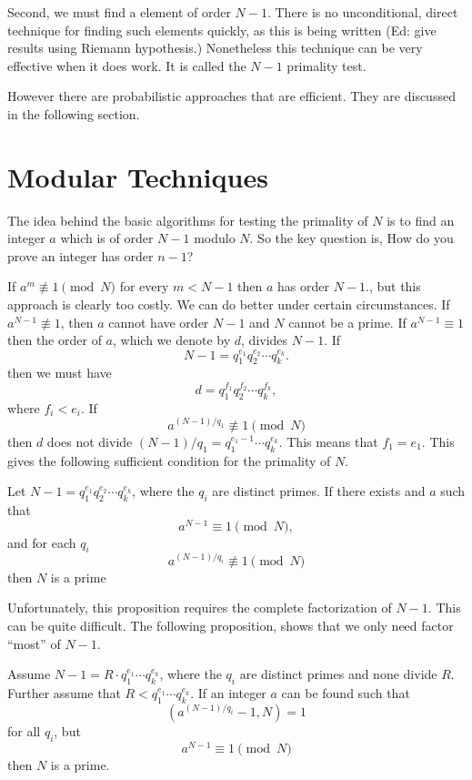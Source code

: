 Second, we must find a element of order $N-1$.  There is no
unconditional, direct technique for finding such elements quickly, as
this is being written (Ed: give results using Riemann hypothesis.)
Nonetheless this technique can be very effective when it does work.  It
is called the $N-1$ primality test.

However there are probabilistic approaches that are efficient.  They are
discussed in the following section.  

\section{Modular Techniques}

The idea behind the basic algorithms for testing the primality of $N$
is to find an integer $a$ which is of order $N-1$ modulo $N$.  So the
key question is, How do you prove an integer has order $n-1$?  

If $a^m \not\equiv 1 \pmod{N}$ for every $m < N -1 $ then $a$ has order
$N-1$., but this approach is clearly too costly.  We can do better
under certain circumstances.  If $a^{N-1} \not\equiv 1$, then $a$
cannot have order $N-1$ and $N$ cannot be a prime.  If $a^{N-1}\equiv
1$ then the order of $a$, which we denote by $d$, divides $N-1$.  If
\[
N - 1 = q_1^{e_1} q_2^{e_2} \cdots q_k^{e_k}.
\]
then we must have
\[
d =  q_1^{f_1} q_2^{f_2} \cdots q_k^{f_k},
\]
where $f_i < e_i$.  If 
\[
a^{(N-1)/q_1} \not\equiv 1 \pmod{N}
\]
then $d$ does not divide $(N - 1)/q_1 = q_1^{e_1-1} \cdots q_k^{e_k}$.
This means that $f_1 = e_1$.    This gives the following sufficient
condition for the primality of $N$.

\begin{proposition}
Let $N-1 = q_1^{e_1} q_2^{e_2} \cdots q_k^{e_k}$, where the $q_i$ are
distinct primes.  If there exists and $a$ such that
\[
a^{N-1} \equiv 1 \pmod{N},
\]
and for each $q_i$
\[
a^{(N-1)/q_i} \not\equiv 1 \pmod{N}
\]
then $N$ is a prime
\end{proposition}

Unfortunately, this proposition requires the complete factorization of
$N-1$.  This can be quite difficult.  The following proposition, shows
that we only need factor ``most'' of $N-1$.

\begin{proposition}
Assume $N-1 = R \cdot q_1^{e_1} \cdots q_k^{e_k}$, where the
$q_i$ are distinct primes and none divide $R$.  Further assume that 
$R < q_1^{e_1} \cdots q_k^{e_k}$.  If an integer $a$ can be found such
that 
\begin{equation}\label{Prim:Mod:GCD:Eq}
(a^{(N-1)/q_i} -1, N) = 1
\end{equation}
for all $q_i$, but
\[
a^{N-1} \equiv 1 \pmod{N}
\]
then $N$ is a prime.
\end{proposition}

